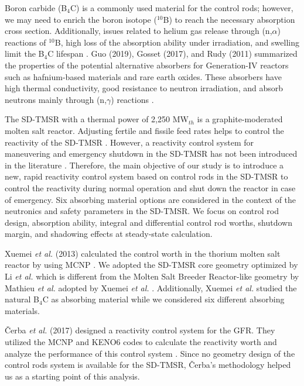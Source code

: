 Boron carbide (B$_4$C) is a commonly used material for the control rods; 
however, we may need to enrich the boron isotope ($^{10}$B) to reach 
the necessary absorption cross section. Additionally, issues related to helium gas release through (n,$\alpha$) reactions of $^{10}$B, high loss of the absorption ability under irradiation, and swelling limit the B$_4$C lifespan 
\cite{guo2019optimized}. Guo (2019), Gosset (2017), and Rudy (2011) summarized the properties of the 
potential alternative absorbers for Generation-IV reactors such as 
hafnium-based materials and rare earth oxides. These absorbers have 
high thermal conductivity, good resistance to neutron irradiation, and
absorb neutrons mainly through (n,$\gamma$) reactions
\cite{guo2019optimized}.

The SD-TMSR with a thermal power of 2,250 MW$_{th}$ 
\cite{li_optimization_2018} is a graphite-moderated 
molten salt reactor. Adjusting fertile and fissile feed rates helps to control the reactivity of 
the SD-TMSR \cite{ashraf2020Strategies,li_optimization_2018}. However, a reactivity control system for maneuvering and emergency shutdown in the SD-TMSR has not been introduced in the literature \cite{li_optimization_2018,zou2018transition,zhang2020radiotoxicity}. Therefore, the main objective of our study is to introduce a new, 
rapid reactivity control system based on control rods in the SD-TMSR to control 
the reactivity during normal operation and shut down the reactor in case of 
emergency. Six absorbing material options are considered in the context of the 
neutronics and safety parameters in the SD-TMSR. We 
focus on control rod design, absorption ability, integral and differential 
control rod worths, shutdown margin, and shadowing 
effects at steady-state calculation.

Xuemei \emph{et al.} (2013) calculated the control worth in the thorium molten salt
reactor by using MCNP \cite{briesmeister2000mcnptm}. We adopted the SD-TMSR
core geometry optimized by Li \emph{et al.} \cite{li_optimization_2018} which
is different from the Molten Salt Breeder Reactor-like geometry by Mathieu \emph{et al.}
\cite{mathieu2006thorium} adopted by Xuemei \emph{et al.} \cite{xuemei2013study}.
Additionally, Xuemei \emph{et al.} studied the natural B$_4$C as absorbing material
while we considered six different absorbing materials.

\v{C}erba \emph{et al.} (2017) designed a reactivity control system for the 
GFR. They utilized the MCNP \cite{briesmeister2000mcnptm} and KENO6 codes 
\cite{petrie1984keno} to calculate the reactivity worth and analyze the 
performance of this control system \cite{vcerba2017optimization}. Since no
geometry design of the control rods system is available for the SD-TMSR, 
\v{C}erba's methodology \cite{vcerba2017optimization} helped us as a starting 
point of this analysis.

